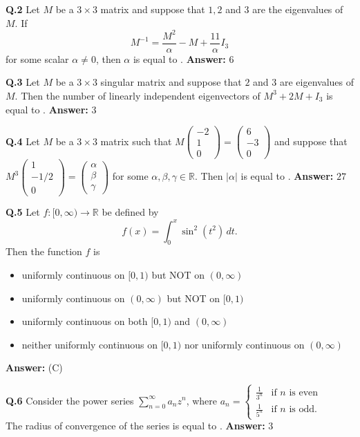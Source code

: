 \documentclass[11pt,a4paper]{article}
\newcommand{\optslistA}[4]{%
  \begin{itemize}
    \setlength{\itemsep}{2pt}\setlength{\parskip}{0pt}
    \item[(A)] #1
    \item[(B)] #2
    \item[(C)] #3
    \item[(D)] #4
  \end{itemize}%
}
\newcommand{\ans}[1]{\textbf{Answer:} #1\par\medskip}
\begin{document}
\textbf{Q.2} Let $M$ be a $3 \times 3$ matrix and suppose that $1, 2$ and $3$ are the eigenvalues of $M$. If
\[
  M^{-1} = \frac{M^2}{\alpha} - M + \frac{11}{\alpha} I_3
\]
for some scalar $\alpha \neq 0$, then $\alpha$ is equal to \underline{\hspace{2cm}}.
\ans{$6$}

\textbf{Q.3} Let $M$ be a $3 \times 3$ singular matrix and suppose that $2$ and $3$ are eigenvalues of $M$. Then the number of linearly independent eigenvectors of $M^3 + 2M + I_3$ is equal to \underline{\hspace{2cm}}.
\ans{$3$}

\textbf{Q.4} Let $M$ be a $3 \times 3$ matrix such that $M \begin{pmatrix} -2 \\ 1 \\ 0 \end{pmatrix} = \begin{pmatrix} 6 \\ -3 \\ 0 \end{pmatrix}$ and suppose that $M^3 \begin{pmatrix} 1 \\ -1/2 \\ 0 \end{pmatrix} = \begin{pmatrix} \alpha \\ \beta \\ \gamma \end{pmatrix}$ for some $\alpha, \beta, \gamma \in \mathbb{R}$. Then $|\alpha|$ is equal to \underline{\hspace{2cm}}.
\ans{$27$}

\textbf{Q.5} Let $f : [0, \infty) \to \mathbb{R}$ be defined by
\[
  f(x) = \int_0^x \sin^2(t^2)\,dt.
\]
Then the function $f$ is
\optslistA{uniformly continuous on $[0, 1)$ but NOT on $(0, \infty)$}{uniformly continuous on $(0, \infty)$ but NOT on $[0, 1)$}{uniformly continuous on both $[0, 1)$ and $(0, \infty)$}{neither uniformly continuous on $[0, 1)$ nor uniformly continuous on $(0, \infty)$}
\ans{(C)}

\textbf{Q.6} Consider the power series $\sum_{n=0}^{\infty} a_n z^n$, where $a_n = \begin{cases} \frac{1}{3^n} & \text{if } n \text{ is even} \\ \frac{1}{5^n} & \text{if } n \text{ is odd.} \end{cases}$\\
The radius of convergence of the series is equal to \underline{\hspace{2cm}}.
\ans{$3$}
\end{document}
